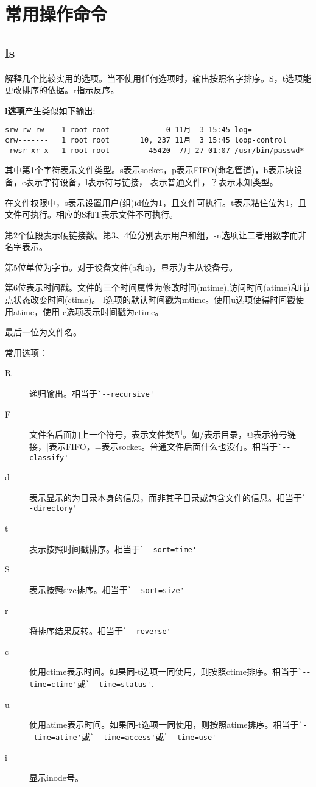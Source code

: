 \section{常用操作命令}

\subsection{ls}
解释几个比较实用的选项。当不使用任何选项时，输出按照名字排序。S，t选项能更改排序的依据。r指示反序。

\textbf{l选项}产生类似如下输出:
\begin{verbatim}
srw-rw-rw-   1 root root             0 11月  3 15:45 log=
crw-------   1 root root       10, 237 11月  3 15:45 loop-control
-rwsr-xr-x   1 root root         45420  7月 27 01:07 /usr/bin/passwd*
\end{verbatim}
其中第1个字符表示文件类型。s表示socket，p表示FIFO(命名管道)，b表示块设备，c表示字符设备，l表示符号链接，-表示普通文件，？表示未知类型。

在文件权限中，s表示设置用户(组)id位为1，且文件可执行。t表示粘住位为1，且文件可执行。相应的S和T表示文件不可执行。

第2个位段表示硬链接数。第3、4位分别表示用户和组，-n选项让二者用数字而非名字表示。

第5位单位为字节。对于设备文件(b和c)，显示为主从设备号。

第6位表示时间戳。文件的三个时间属性为修改时间(mtime),访问时间(atime)和i节点状态改变时间(ctime)。-l选项的默认时间戳为mtime。使用u选项使得时间戳使用atime，使用-c选项表示时间戳为ctime。

最后一位为文件名。

常用选项：
\begin{description}
	\item[R]递归输出。相当于\verb|`--recursive'|
	\item[F]文件名后面加上一个符号，表示文件类型。如/表示目录，@表示符号链接，|表示FIFO，=表示socket。普通文件后面什么也没有。相当于\verb|`--classify'|
	\item[d]表示显示的为目录本身的信息，而非其子目录或包含文件的信息。相当于\verb|`--directory'|
	\item[t]表示按照时间戳排序。相当于\verb|`--sort=time'|
	\item[S]表示按照size排序。相当于\verb|`--sort=size'|
	\item[r]将排序结果反转。相当于\verb|`--reverse'|
	\item[c]使用ctime表示时间。如果同-t选项一同使用，则按照ctime排序。相当于\verb$`--time=ctime'$或\verb$`--time=status'$.
	\item[u]使用atime表示时间。如果同-t选项一同使用，则按照atime排序。相当于\verb$`--time=atime'$或\verb$`--time=access'$或\verb$`--time=use'$
	\item[i]显示inode号。
\end{description}

